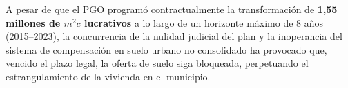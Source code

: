 







A pesar de que el PGO programó contractualmente la transformación de \textbf{1,55 millones de $m^2c$ lucrativos} a lo largo de un horizonte máximo de 8 años (2015–2023), la concurrencia de la nulidad judicial del plan y la inoperancia del sistema de compensación en suelo urbano no consolidado ha provocado que, vencido el plazo legal, la oferta de suelo siga bloqueada, perpetuando el estrangulamiento de la vivienda en el municipio.

